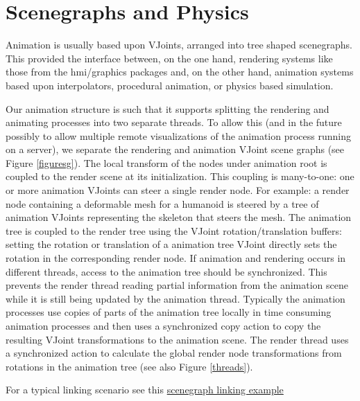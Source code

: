 


\section{Scenegraphs and Physics}

Animation is usually based upon VJoints, arranged into tree shaped scenegraphs.
This provided the interface between, on the one hand, rendering systems like those
from the hmi/graphics packages and, on the other hand, animation systems based upon interpolators, procedural animation,
or physics based simulation.

 Our animation structure is such that it supports splitting the rendering and animating processes into two separate threads. To allow this (and in the future possibly to allow multiple remote visualizations of the animation process running on a server), we separate the rendering and animation VJoint scene graphs (see Figure \ref{figuresg}). The local transform of the nodes under animation root is coupled to the render scene at its initialization. This coupling is many-to-one: one or more animation VJoints can steer a single render node. For example: a render node containing a deformable mesh for a humanoid is steered by a tree of animation VJoints representing the skeleton that steers the mesh. The animation tree is coupled to the render tree using the VJoint rotation/translation buffers: setting the rotation or translation of a animation tree VJoint directly sets the rotation in the corresponding render node. If animation and rendering occurs in different threads, access to the animation tree should be synchronized. This prevents the render thread reading partial information from the animation scene while it is still being updated by the animation thread. Typically the animation processes use copies of parts of the animation tree locally in time consuming animation processes and then uses a synchronized copy action to copy the resulting VJoint transformations to the animation scene. The render thread uses a synchronized action to calculate the global render node transformations from rotations in the animation tree (see also Figure \ref{threads}).

For a typical linking scenario see this \href{\hmianimationreportdir/typical_scenegraph.pdf}{scenegraph linking example}

